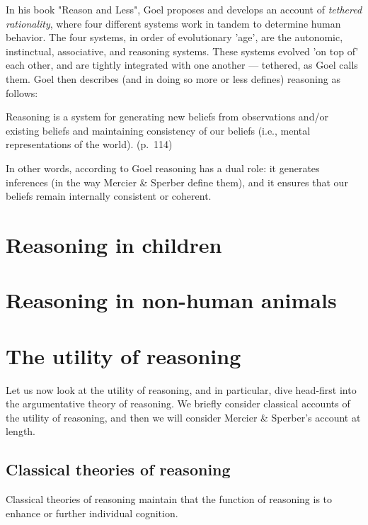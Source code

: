 In his \citeyear{Goel22} book "Reason and Less", Goel proposes and develops an account of \emph{tethered rationality}, where four different systems work in tandem to determine human behavior. The four systems, in order of evolutionary 'age', are the autonomic, instinctual, associative, and reasoning systems. These systems evolved 'on top of' each other, and are tightly integrated with one another --- tethered, as Goel calls them.
Goel then describes (and in doing so more or less defines) reasoning as follows:
\begin{quoting}
    Reasoning is a system for generating new beliefs from observations and/or existing beliefs and maintaining consistency of our beliefs (i.e., mental representations of the world).
    \hfill (p.~114)
\end{quoting}
In other words, according to Goel reasoning has a dual role: it generates inferences (in the way Mercier \& Sperber define them), and it ensures that our beliefs remain internally consistent or coherent.


\section{Reasoning in children}

\section{Reasoning in non-human animals}

\section{The utility of reasoning}

Let us now look at the utility of reasoning, and in particular, dive head-first into the argumentative theory of reasoning.
We briefly consider classical accounts of the utility of reasoning, and then we will consider Mercier \& Sperber's account at length.

\subsection{Classical theories of reasoning}

Classical theories of reasoning maintain that the function of reasoning is to enhance or further individual cognition.

